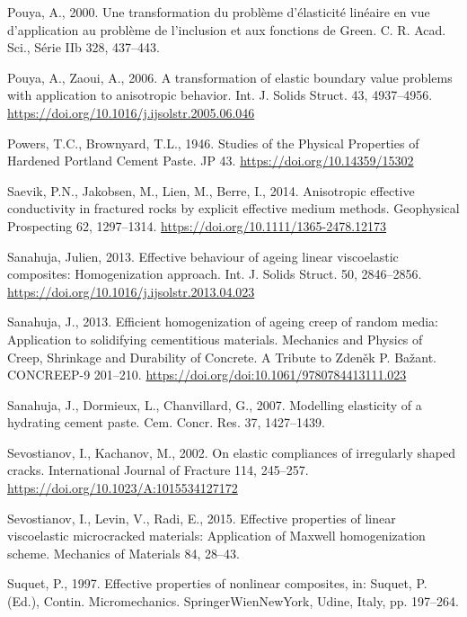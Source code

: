 \documentclass[
  a4paper,
  numbers=noendperiod,
  DIV=12]{scrreprt}
\newlength{\cslhangindent}
\newenvironment{CSLReferences}[2] %
 {\begin{list}{}{%
  \setlength{\itemindent}{0pt}
  \setlength{\leftmargin}{0pt}
  \setlength{\parsep}{0pt}
  \ifodd #1
   \setlength{\leftmargin}{\cslhangindent}
   \setlength{\itemindent}{-1\cslhangindent}
  \fi
  \setlength{\itemsep}{#2\baselineskip}}}
 {\end{list}}
\begin{document}
\begin{CSLReferences}{1}{0}
Pouya, A., 2000. Une transformation du problème d'élasticité linéaire en
vue d'application au problème de l'inclusion et aux fonctions de
{Green}. C. R. Acad. Sci., Série IIb 328, 437--443.

Pouya, A., Zaoui, A., 2006. A transformation of elastic boundary value
problems with application to anisotropic behavior. Int. J. Solids
Struct. 43, 4937--4956.
\url{https://doi.org/10.1016/j.ijsolstr.2005.06.046}

Powers, T.C., Brownyard, T.L., 1946. Studies of the {Physical
Properties} of {Hardened Portland Cement Paste}. JP 43.
\url{https://doi.org/10.14359/15302}

Saevik, P.N., Jakobsen, M., Lien, M., Berre, I., 2014. Anisotropic
effective conductivity in fractured rocks by explicit effective medium
methods. Geophysical Prospecting 62, 1297--1314.
\url{https://doi.org/10.1111/1365-2478.12173}

Sanahuja, Julien, 2013. Effective behaviour of ageing linear
viscoelastic composites: {Homogenization} approach. Int. J. Solids
Struct. 50, 2846--2856.
\url{https://doi.org/10.1016/j.ijsolstr.2013.04.023}

Sanahuja, J., 2013. Efficient homogenization of ageing creep of random
media: Application to solidifying cementitious materials. Mechanics and
Physics of Creep, Shrinkage and Durability of Concrete. A Tribute to
Zdeněk P. Bažant. CONCREEP-9 201--210.
\url{https://doi.org/doi:10.1061/9780784413111.023}

Sanahuja, J., Dormieux, L., Chanvillard, G., 2007. Modelling elasticity
of a hydrating cement paste. Cem. Concr. Res. 37, 1427--1439.

Sevostianov, I., Kachanov, M., 2002. On elastic compliances of
irregularly shaped cracks. International Journal of Fracture 114,
245--257. \url{https://doi.org/10.1023/A:1015534127172}

Sevostianov, I., Levin, V., Radi, E., 2015. Effective properties of
linear viscoelastic microcracked materials: {Application} of {Maxwell}
homogenization scheme. Mechanics of Materials 84, 28--43.

Suquet, P., 1997. Effective properties of nonlinear composites, in:
Suquet, P. (Ed.), Contin. Micromechanics. SpringerWienNewYork, Udine,
Italy, pp. 197--264.


\end{CSLReferences}
\end{document}
